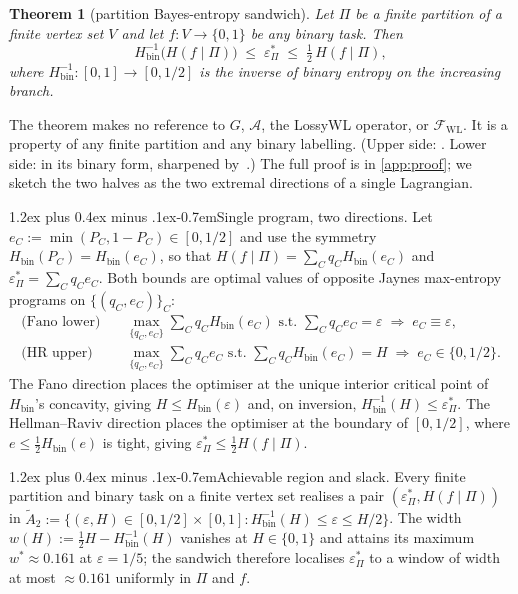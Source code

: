 \documentclass[10pt]{article}
\makeatletter
\def\paragraph{\@startsection{paragraph}{4}{\z@}%
  {1.2ex plus 0.4ex minus .1ex}{-0.7em}{\normalsize\bf}}
\newtheorem{theorem}{Theorem}
\theoremstyle{definition}
\theoremstyle{remark}
\newcommand{\Hbin}{H_{\mathrm{bin}}}
\newcommand{\eps}{\varepsilon}
\newcommand{\epsP}{\eps^{*}_{\Pi}}
\newcommand{\Fwl}{\mathcal{F}_{\mathrm{WL}}}
\makeatother
\begin{document}
\begin{theorem}[partition Bayes-entropy sandwich]\label{thm:sandwich}
Let $\Pi$ be a finite partition of a finite vertex set $V$ and let
$f : V \to \{0,1\}$ be any binary task. Then
\[
  \Hbin^{-1}\!\bigl(H(f \mid \Pi)\bigr) \;\le\; \epsP \;\le\; \tfrac{1}{2}\,H(f \mid \Pi),
\]
where $\Hbin^{-1} : [0, 1] \to [0, 1/2]$ is the inverse of binary
entropy on the increasing branch.
\end{theorem}

The theorem makes no reference to $G$, $\mathcal{A}$, the LossyWL
operator, or $\Fwl$. It is a property of any finite partition and
any binary labelling. (Upper side: \citealp{hellmanraviv1970}. Lower
side: \citealp{fano1961} in its binary form, sharpened
by~\citealp{feder1994}.) The full proof is in
\cref{app:proof}; we sketch the two halves as the two
extremal directions of a single Lagrangian.

\paragraph{Single program, two directions.} Let
$e_C := \min(P_C, 1 - P_C) \in [0, 1/2]$ and use the symmetry
$\Hbin(P_C) = \Hbin(e_C)$, so that
$H(f \mid \Pi) = \sum_C q_C \Hbin(e_C)$ and
$\epsP = \sum_C q_C e_C$. Both bounds are optimal values of opposite
Jaynes max-entropy programs on $\{(q_C, e_C)\}_C$:
\begin{align*}
\text{(Fano lower)} \quad
& \max_{\{q_C, e_C\}} \sum_C q_C \Hbin(e_C)
  \text{ s.t. } \sum_C q_C e_C = \eps
  \;\Longrightarrow\; e_C \equiv \eps, \\
\text{(HR upper)} \quad
& \max_{\{q_C, e_C\}} \sum_C q_C e_C
  \text{ s.t. } \sum_C q_C \Hbin(e_C) = H
  \;\Longrightarrow\; e_C \in \{0, 1/2\}.
\end{align*}
The Fano direction places the optimiser at the unique interior
critical point of $\Hbin$'s concavity, giving
$H \le \Hbin(\eps)$ and, on inversion,
$\Hbin^{-1}(H) \le \epsP$. The Hellman--Raviv direction places the
optimiser at the boundary of $[0, 1/2]$, where
$e \le \tfrac{1}{2}\Hbin(e)$ is tight, giving
$\epsP \le \tfrac{1}{2} H(f \mid \Pi)$.

\paragraph{Achievable region and slack.} Every finite partition and
binary task on a finite vertex set realises a pair
$(\epsP, H(f\mid\Pi))$ in
$\widetilde{A}_2 := \{(\eps, H) \in [0,1/2] \times [0,1] :
\Hbin^{-1}(H) \le \eps \le H/2\}$.
The width $w(H) := \tfrac{1}{2} H - \Hbin^{-1}(H)$ vanishes at
$H \in \{0, 1\}$ and attains its maximum
$w^{*} \approx 0.161$ at $\eps = 1/5$; the sandwich therefore
localises $\epsP$ to a window of width at most $\approx 0.161$
uniformly in $\Pi$ and $f$.
\end{document}
